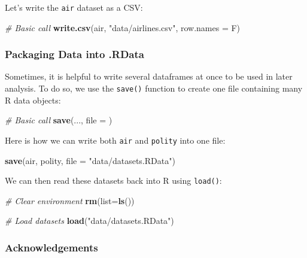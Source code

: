 \documentclass[]{book}
\newenvironment{Shaded}{\begin{snugshade}}{\end{snugshade}}
\newcommand{\KeywordTok}[1]{\textcolor[rgb]{0.13,0.29,0.53}{\textbf{#1}}}
\newcommand{\DataTypeTok}[1]{\textcolor[rgb]{0.13,0.29,0.53}{#1}}
\newcommand{\StringTok}[1]{\textcolor[rgb]{0.31,0.60,0.02}{#1}}
\newcommand{\CommentTok}[1]{\textcolor[rgb]{0.56,0.35,0.01}{\textit{#1}}}
\newcommand{\NormalTok}[1]{#1}
\begin{document}
Let's write the \texttt{air} dataset as a CSV:

\begin{Shaded}
\begin{Highlighting}[]
\CommentTok{# Basic call}
\KeywordTok{write.csv}\NormalTok{(air, }\StringTok{"data/airlines.csv"}\NormalTok{, }\DataTypeTok{row.names =}\NormalTok{ F)}
\end{Highlighting}
\end{Shaded}

\subsubsection*{Packaging Data into
.RData}\label{packaging-data-into-.rdata}

Sometimes, it is helpful to write several dataframes at once to be used
in later analysis. To do so, we use the \texttt{save()} function to
create one file containing many R data objects:

\begin{Shaded}
\begin{Highlighting}[]
\CommentTok{# Basic call}
\KeywordTok{save}\NormalTok{(..., }\DataTypeTok{file =}\NormalTok{ )}
\end{Highlighting}
\end{Shaded}

Here is how we can write both \texttt{air} and \texttt{polity} into one
file:

\begin{Shaded}
\begin{Highlighting}[]
\KeywordTok{save}\NormalTok{(air, polity, }\DataTypeTok{file =} \StringTok{"data/datasets.RData"}\NormalTok{)}
\end{Highlighting}
\end{Shaded}

We can then read these datasets back into R using \texttt{load()}:

\begin{Shaded}
\begin{Highlighting}[]
\CommentTok{# Clear environment}
\KeywordTok{rm}\NormalTok{(}\DataTypeTok{list=}\KeywordTok{ls}\NormalTok{())}

\CommentTok{# Load datasets}
\KeywordTok{load}\NormalTok{(}\StringTok{"data/datasets.RData"}\NormalTok{)}
\end{Highlighting}
\end{Shaded}

\subsubsection*{Acknowledgements}\label{acknowledgements}
\end{document}
